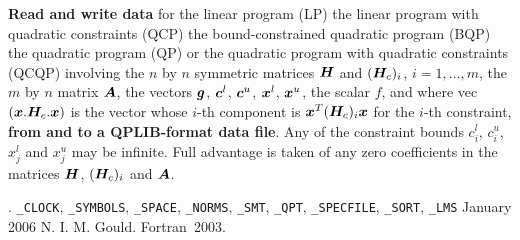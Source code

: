 \documentclass{galahad}
\newcommand{\packagename}{RPD}
\newcommand{\fullpackagename}{\libraryname\_\packagename}
\begin{document}
\galheader


\galsummary
{\bf Read and write data} for the linear program (LP)
the linear program with quadratic constraints (QCP)
the bound-constrained quadratic program (BQP)
the quadratic program (QP)
or the quadratic program with quadratic constraints (QCQP)
involving the $n$ by $n$ symmetric matrices ${\bm{H}}$
and $({\bm{H}}_c)_i$, $i = 1,\ldots,m$, the $m$ by $n$ matrix ${\bm{A}}$,
the vectors ${\bm{g}}$, ${\bm{c}}^{l}$, ${\bm{c}}^{u}$, ${\bm{x}}^{l}$,
${\bm{x}}^{u}$, the scalar $f$, and
where vec$( {\bm{x}} . {\bm{H}}_c . {\bm{x}} )$ is the vector whose
$i$-th component is  ${\bm{x}}^T ({\bm{H}}_c)_i {\bm{x}}$ for the $i$-th constraint,
{\bf from and to a QPLIB-format data file}.
Any of the constraint bounds $c_{i}^{l}$, $c_{i}^{u}$,
$x_{j}^{l}$ and $x_{j}^{u}$ may be infinite.
Full advantage is taken of any zero coefficients in the matrices ${\bm{H}}$,
$({\bm{H}}_c)_i$ and ${\bm{A}}$.


\galattributes
\galversions{\tt  \fullpackagename\_single, \fullpackagename\_double}.
\galuses
{\tt \libraryname\_CLOCK},
{\tt \libraryname\_SY\-M\-BOLS},
{\tt \libraryname\_SPACE}, {\tt \libraryname\_\-NORMS},
{\tt \libraryname\_\-SMT},
{\tt \libraryname\_\-QPT},
{\tt \libraryname\_SPECFILE},
{\tt \libraryname\_SORT},
{\tt \libraryname\_LMS}
\galdate January 2006
\galorigin N. I. M. Gould.
\gallanguage Fortran~2003.


\galhowto
\end{document}

